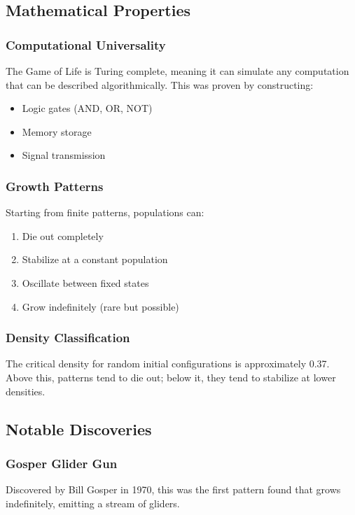 \documentclass{article}
\begin{document}
\subsection{Mathematical Properties}

\subsubsection{Computational Universality}
The Game of Life is Turing complete, meaning it can simulate any computation that can be described algorithmically. This was proven by constructing:

\begin{itemize}
\item Logic gates (AND, OR, NOT)
\item Memory storage
\item Signal transmission
\end{itemize}

\subsubsection{Growth Patterns}
Starting from finite patterns, populations can:

\begin{enumerate}
\item Die out completely
\item Stabilize at a constant population
\item Oscillate between fixed states
\item Grow indefinitely (rare but possible)
\end{enumerate}

\subsubsection{Density Classification}
The critical density for random initial configurations is approximately 0.37. Above this, patterns tend to die out; below it, they tend to stabilize at lower densities.

\subsection{Notable Discoveries}

\subsubsection{Gosper Glider Gun}
Discovered by Bill Gosper in 1970, this was the first pattern found that grows indefinitely, emitting a stream of gliders.
\end{document}

